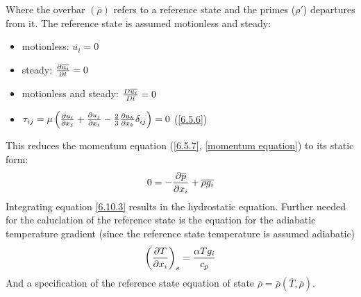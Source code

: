 \documentclass[document.tex]{subfiles}
\begin{document}
Where the overbar $(\overline{\rho})$ refers to a reference state and the primes ($\rho'$) departures from it. 
The reference state is assumed motionless and steady:
\begin{itemize}
    \item motionless: $\overline{u_i} = 0$
    \item steady: $\pdv{\overline{u_i}}{t} = 0$
    \item motionless and steady: $\frac{D \overline{u_i}}{D t} = 0$
    \item $\tau_{ij} = \mu \left(\pdv{u_i}{x_j}+\pdv{u_j}{x_i} - \frac{2}{3}\pdv{u_k}{x_k}\delta_{ij}\right) = 0$ (\ref{6.5.6})
\end{itemize}
This reduces the momentum equation (\ref{6.5.7}, \ref{momentum equation}) to its static form: 
\begin{equation} \label{6.10.3}
    0 = -\pdv{\overline{p}}{x_i} + \overline{\rho g_i}
\end{equation}
Integrating equation \ref{6.10.3} results in the hydrostatic equation. Further needed for the caluclation of the reference
state is the equation for the adiabatic temperature gradient (since the reference state temperature is assumed adiabatic)
\begin{equation}
    \left(\pdv{T}{x_i}\right)_s = \frac{\alpha T g_i}{c_p}
\end{equation}
And a specification of the reference state equation of state $\overline{\rho} = \overline{\rho}(\overline{T}, \overline{\rho})$.
\end{document}
